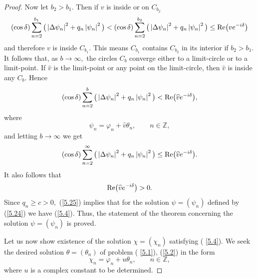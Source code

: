 \begin{proof}
Now let $b_{2}>b_{1}.$ Then if $v$ is inside or on $C_{b_{2}}$%
\[
(\cos \delta )\sum_{n=2}^{b_{1}}\big( \left\vert \Delta \psi
_{n}\right\vert ^{2}+q_{n}\left\vert \psi _{n}\right\vert ^{2}\big) <(\cos
\delta )\sum_{n=2}^{b_{2}}\big( \left\vert \Delta \psi _{n}\right\vert
^{2}+q_{n}\left\vert \psi _{n}\right\vert ^{2}\big) \leq {\rm Re}
\big(ve^{-i\delta }\big)
\]%
and therefore $v$ is inside $C_{b_{1}}.$ This means $C_{b_{1}}$ contains $%
C_{b_{2}}$ in its interior if $b_{2}>b_{1}.$ It follows that, as $%
b\rightarrow \infty ,$ the circles $C_{b}$ converge either to a limit-circle
or to a limit-point. If $\widehat{v}$ is the limit-point or any point on the
limit-circle, then $\widehat{v}$ is inside any $C_{b}.$ Hence%
\[
(\cos \delta )\sum_{n=2}^{b}\big( \left\vert \Delta \psi _{n}\right\vert
^{2}+q_{n}\left\vert \psi _{n}\right\vert ^{2}\big) <{\rm Re}\big(\widehat{v}%
e^{-i\delta }\big),
\]%
where%
\begin{equation}
\psi _{n}=\varphi _{n}+\widehat{v}\theta _{n},\qquad n\in
\mathbb{Z}
,  \label{5.24}
\end{equation}%
and letting $b\rightarrow \infty $ we get%
\begin{equation}
(\cos \delta )\sum_{n=2}^{\infty }\big( \left\vert \Delta \psi
_{n}\right\vert ^{2}+q_{n}\left\vert \psi _{n}\right\vert ^{2}\big) \leq
{\rm Re}\big(\widehat{v}e^{-i\delta }\big).  \label{5.25}
\end{equation}%
It also follows that%
\begin{equation}
{\rm Re}\big(\widehat{v}e^{-i\delta }\big)>0.  \label{5.26}
\end{equation}%
Since $q_{n}\geq c>0,$ (\ref{5.25}) implies that for the solution $\psi
=(\psi _{n})$ def\/ined by (\ref{5.24}) we have (\ref{5.4}). Thus, the
statement of the theorem concerning the solution $\psi =(\psi _{n})$ is
proved.

Let us now show existence of the solution $\chi =(\chi _{n})$ satisfying (%
\ref{5.4}). We seek the desired solution $\theta =(\theta _{n})$ of problem (%
\ref{5.1}), (\ref{5.2}) in the form%
\[
\chi _{n}=\varphi _{n}+u\theta _{n},\qquad n\in
\mathbb{Z}
,
\]
where $u$ is a complex constant to be determined.


\end{proof}
